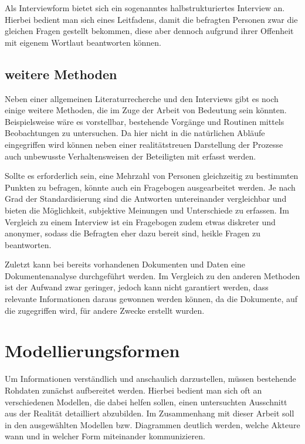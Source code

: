 Als Interviewform bietet sich ein sogenanntes halbstrukturiertes Interview an. Hierbei bedient man sich eines Leitfadens, damit die befragten Personen zwar die gleichen Fragen gestellt bekommen, diese aber dennoch aufgrund ihrer Offenheit mit eigenem Wortlaut beantworten können.

\subsection{weitere Methoden}

Neben einer allgemeinen Literaturrecherche und den Interviews gibt es noch einige weitere Methoden, die im Zuge der Arbeit von Bedeutung sein könnten. Beispielsweise wäre es vorstellbar, bestehende Vorgänge und Routinen mittels Beobachtungen zu untersuchen. Da hier nicht in die natürlichen Abläufe eingegriffen wird können neben einer realitätstreuen Darstellung der Prozesse auch unbewusste Verhaltensweisen der Beteiligten mit erfasst werden.

Sollte es erforderlich sein, eine Mehrzahl von Personen gleichzeitig zu bestimmten Punkten zu befragen, könnte auch ein Fragebogen ausgearbeitet werden. Je nach Grad der Standardisierung sind die Antworten untereinander vergleichbar und bieten die Möglichkeit, subjektive Meinungen und Unterschiede zu erfassen. Im Vergleich zu einem Interview ist ein Fragebogen zudem etwas diskreter und anonymer, sodass die Befragten eher dazu bereit sind, heikle Fragen zu beantworten.

Zuletzt kann bei bereits vorhandenen Dokumenten und Daten eine Dokumentenanalyse durchgeführt werden. Im Vergleich zu den anderen Methoden ist der Aufwand zwar geringer, jedoch kann nicht garantiert werden, dass relevante Informationen daraus gewonnen werden können, da die Dokumente, auf die zugegriffen wird, für andere Zwecke erstellt wurden. \citep{Doering.2015}


\section{Modellierungsformen}

Um Informationen verständlich und anschaulich darzustellen, müssen bestehende Rohdaten zunächst aufbereitet werden. Hierbei bedient man sich oft an verschiedenen Modellen, die dabei helfen sollen, einen untersuchten Ausschnitt aus der Realität detailliert abzubilden. Im Zusammenhang mit dieser Arbeit soll in den ausgewählten Modellen bzw. Diagrammen deutlich werden, welche Akteure wann und in welcher Form miteinander kommunizieren.

